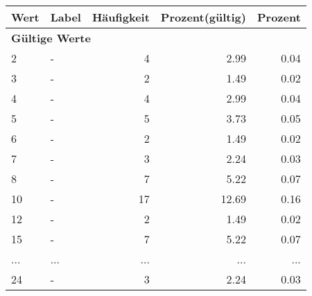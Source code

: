      \begin{longtable}{lXrrr}
     \toprule
     \textbf{Wert} & \textbf{Label} & \textbf{Häufigkeit} & \textbf{Prozent(gültig)} & \textbf{Prozent} \\
     \endhead
     \midrule
     \multicolumn{5}{l}{\textbf{Gültige Werte}}\\
        2 & \multicolumn{1}{X}{-} & %
          \num{4} &
          \num[round-mode=places,round-precision=2]{2.99} &
          \num[round-mode=places,round-precision=2]{0.04} \\
        3 & \multicolumn{1}{X}{-} & %
          \num{2} &
          \num[round-mode=places,round-precision=2]{1.49} &
          \num[round-mode=places,round-precision=2]{0.02} \\
        4 & \multicolumn{1}{X}{-} & %
          \num{4} &
          \num[round-mode=places,round-precision=2]{2.99} &
          \num[round-mode=places,round-precision=2]{0.04} \\
        5 & \multicolumn{1}{X}{-} & %
          \num{5} &
          \num[round-mode=places,round-precision=2]{3.73} &
          \num[round-mode=places,round-precision=2]{0.05} \\
        6 & \multicolumn{1}{X}{-} & %
          \num{2} &
          \num[round-mode=places,round-precision=2]{1.49} &
          \num[round-mode=places,round-precision=2]{0.02} \\
        7 & \multicolumn{1}{X}{-} & %
          \num{3} &
          \num[round-mode=places,round-precision=2]{2.24} &
          \num[round-mode=places,round-precision=2]{0.03} \\
        8 & \multicolumn{1}{X}{-} & %
          \num{7} &
          \num[round-mode=places,round-precision=2]{5.22} &
          \num[round-mode=places,round-precision=2]{0.07} \\
        10 & \multicolumn{1}{X}{-} & %
          \num{17} &
          \num[round-mode=places,round-precision=2]{12.69} &
          \num[round-mode=places,round-precision=2]{0.16} \\
        12 & \multicolumn{1}{X}{-} & %
          \num{2} &
          \num[round-mode=places,round-precision=2]{1.49} &
          \num[round-mode=places,round-precision=2]{0.02} \\
        15 & \multicolumn{1}{X}{-} & %
          \num{7} &
          \num[round-mode=places,round-precision=2]{5.22} &
          \num[round-mode=places,round-precision=2]{0.07} \\
       ... & ... & ... & ... & ... \\
        24 & \multicolumn{1}{X}{-} & %
          \num{3} &
          \num[round-mode=places,round-precision=2]{2.24} &
          \num[round-mode=places,round-precision=2]{0.03} \\


\end{longtable}
